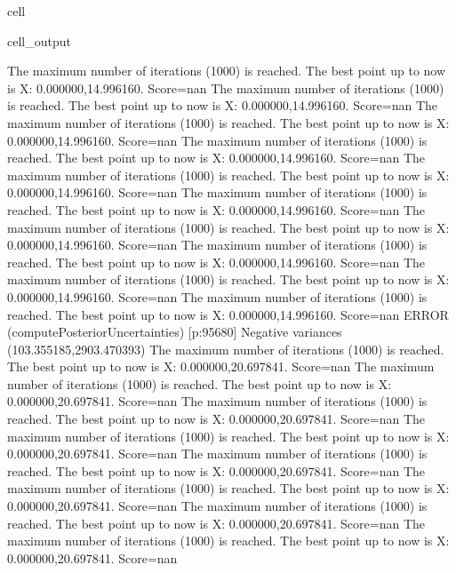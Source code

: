 \documentclass[letterpaper,10pt,english]{jupyterBook}
\begin{document}
\begin{sphinxuseclass}{cell}
\begin{sphinxVerbatimOutput}
\begin{sphinxuseclass}{cell_output}
\begin{sphinxVerbatim}[commandchars=\\\{\}]
The maximum number of iterations (1000) is reached. The best point up to now is X: \PYGZob{}0.000000,14.996160\PYGZcb{}. Score=\PYGZhy{}nan
The maximum number of iterations (1000) is reached. The best point up to now is X: \PYGZob{}0.000000,14.996160\PYGZcb{}. Score=\PYGZhy{}nan
The maximum number of iterations (1000) is reached. The best point up to now is X: \PYGZob{}0.000000,14.996160\PYGZcb{}. Score=\PYGZhy{}nan
The maximum number of iterations (1000) is reached. The best point up to now is X: \PYGZob{}0.000000,14.996160\PYGZcb{}. Score=\PYGZhy{}nan
The maximum number of iterations (1000) is reached. The best point up to now is X: \PYGZob{}0.000000,14.996160\PYGZcb{}. Score=\PYGZhy{}nan
The maximum number of iterations (1000) is reached. The best point up to now is X: \PYGZob{}0.000000,14.996160\PYGZcb{}. Score=\PYGZhy{}nan
The maximum number of iterations (1000) is reached. The best point up to now is X: \PYGZob{}0.000000,14.996160\PYGZcb{}. Score=\PYGZhy{}nan
The maximum number of iterations (1000) is reached. The best point up to now is X: \PYGZob{}0.000000,14.996160\PYGZcb{}. Score=\PYGZhy{}nan
The maximum number of iterations (1000) is reached. The best point up to now is X: \PYGZob{}0.000000,14.996160\PYGZcb{}. Score=\PYGZhy{}nan
The maximum number of iterations (1000) is reached. The best point up to now is X: \PYGZob{}0.000000,14.996160\PYGZcb{}. Score=\PYGZhy{}nan
ERROR (compute\PYGZus{}Posterior\PYGZus{}Uncertainties) [p:95680] Negative variances (\PYGZhy{}103.355185,2903.470393)
The maximum number of iterations (1000) is reached. The best point up to now is X: \PYGZob{}0.000000,20.697841\PYGZcb{}. Score=\PYGZhy{}nan
The maximum number of iterations (1000) is reached. The best point up to now is X: \PYGZob{}0.000000,20.697841\PYGZcb{}. Score=\PYGZhy{}nan
The maximum number of iterations (1000) is reached. The best point up to now is X: \PYGZob{}0.000000,20.697841\PYGZcb{}. Score=\PYGZhy{}nan
The maximum number of iterations (1000) is reached. The best point up to now is X: \PYGZob{}0.000000,20.697841\PYGZcb{}. Score=\PYGZhy{}nan
The maximum number of iterations (1000) is reached. The best point up to now is X: \PYGZob{}0.000000,20.697841\PYGZcb{}. Score=\PYGZhy{}nan
The maximum number of iterations (1000) is reached. The best point up to now is X: \PYGZob{}0.000000,20.697841\PYGZcb{}. Score=\PYGZhy{}nan
The maximum number of iterations (1000) is reached. The best point up to now is X: \PYGZob{}0.000000,20.697841\PYGZcb{}. Score=\PYGZhy{}nan
The maximum number of iterations (1000) is reached. The best point up to now is X: \PYGZob{}0.000000,20.697841\PYGZcb{}. Score=\PYGZhy{}nan

\end{sphinxVerbatim}
\end{sphinxuseclass}
\end{sphinxVerbatimOutput}
\end{sphinxuseclass}
\end{document}
